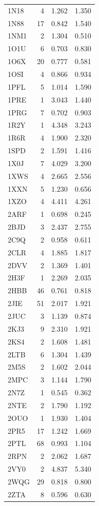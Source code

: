 \documentclass[11pt]{article}
\begin{document}
\begin{longtable}{lrrr}
1N18 & 4 & 1.262 & 1.350\\
1N88 & 17 & 0.842 & 1.540\\
1NM1 & 2 & 1.304 & 0.510\\
1O1U & 6 & 0.703 & 0.830\\
1O6X & 20 & 0.777 & 0.581\\
1OSI & 4 & 0.866 & 0.934\\
1PFL & 5 & 1.014 & 1.590\\
1PRE & 1 & 3.043 & 1.440\\
1PRG & 7 & 0.702 & 0.903\\
1R2Y & 1 & 4.348 & 3.243\\
1R6R & 4 & 1.900 & 2.320\\
1SPD & 2 & 1.591 & 1.416\\
1X0J & 7 & 4.029 & 3.200\\
1XWS & 4 & 2.665 & 2.556\\
1XXN & 5 & 1.230 & 0.656\\
1XZO & 4 & 4.411 & 4.261\\
2ARF & 1 & 0.698 & 0.245\\
2BJD & 3 & 2.437 & 2.755\\
2C9Q & 2 & 0.958 & 0.611\\
2CLR & 4 & 1.885 & 1.817\\
2DVV & 2 & 1.369 & 1.401\\
2H3F & 1 & 2.269 & 2.035\\
2HBB & 46 & 0.761 & 0.818\\
2JIE & 51 & 2.017 & 1.921\\
2JUC & 3 & 1.139 & 0.874\\
2KJ3 & 9 & 2.310 & 1.921\\
2KS4 & 2 & 1.608 & 1.481\\
2LTB & 6 & 1.304 & 1.439\\
2M5S & 2 & 1.602 & 2.044\\
2MPC & 3 & 1.144 & 1.790\\
2N7Z & 1 & 0.545 & 0.362\\
2NTE & 2 & 1.790 & 1.192\\
2OUO & 1 & 1.930 & 1.404\\
2PR5 & 17 & 1.242 & 1.669\\
2PTL & 68 & 0.993 & 1.104\\
2RPN & 2 & 2.062 & 1.687\\
2VY0 & 2 & 4.837 & 5.340\\
2WQG & 29 & 0.818 & 0.800\\
2ZTA & 8 & 0.596 & 0.630\\

\end{longtable}
\end{document}
